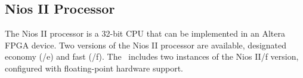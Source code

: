 \subsection{Nios\textsuperscript{\textregistered} II Processor}
\label{sec:nios2}
The Nios II processor is a 32-bit CPU that can be implemented
in an Altera FPGA device.  Two versions of the Nios II processor are available,
designated economy (/e) and fast (/f). The \systemName~includes two instances of the Nios II/f version, configured with floating-point hardware 
support.
